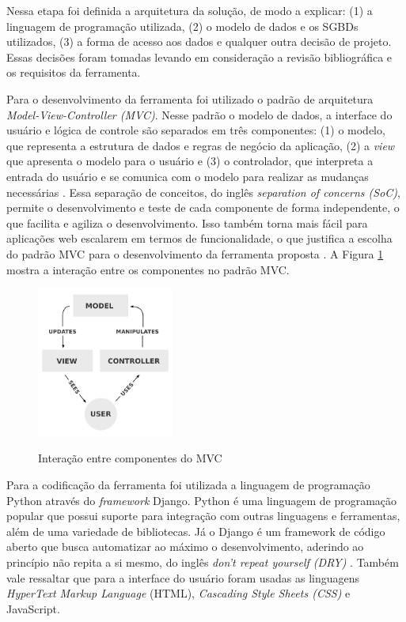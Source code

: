 Nessa etapa foi definida a arquitetura da solução, de modo a explicar: (1) a linguagem de 
programação utilizada, (2) o modelo de dados e os SGBDs utilizados, (3) a forma de acesso 
aos dados e qualquer outra decisão de projeto. Essas decisões foram tomadas levando em 
consideração a revisão bibliográfica e os requisitos da ferramenta.

Para o desenvolvimento da ferramenta foi utilizado o padrão de arquitetura 
\textit{Model-View-Controller (MVC)}. Nesse padrão o modelo de dados, a interface do 
usuário e lógica de controle são separados em três componentes: (1) o modelo, que 
representa a estrutura de dados e regras de negócio da aplicação, (2) a \textit{view} 
que apresenta o modelo para o usuário e (3) o controlador, que interpreta a entrada do 
usuário e se comunica com o modelo para realizar as mudanças necessárias \cite{plekhanova2009evaluating}. 
Essa separação de conceitos, do inglês \textit{separation of concerns (SoC)}, permite o 
desenvolvimento e teste de cada componente de forma independente, o que facilita e agiliza o 
desenvolvimento. Isso também torna mais fácil para aplicações web escalarem em termos de 
funcionalidade, o que justifica a escolha do padrão MVC para o desenvolvimento da ferramenta 
proposta \cite{gupta2012}. A Figura \ref{fig:mvc} mostra a interação entre os componentes no 
padrão MVC.

\begin{figure}[!htb]
    \centering
    \caption{Interação entre componentes do MVC}
    \includegraphics[width=0.4\textwidth]{./04-figuras/mvc}
    \label{fig:mvc}
\end{figure}

Para a codificação da ferramenta foi utilizada a linguagem de programação Python através do 
\textit{framework} Django. Python é uma linguagem de programação popular que possui suporte 
para integração com outras linguagens e ferramentas, além de uma variedade de bibliotecas. 
Já o Django é um framework de código aberto que busca automatizar ao máximo o desenvolvimento, 
aderindo ao princípio não repita a si mesmo, do inglês \textit{don’t repeat yourself (DRY)} 
\cite{plekhanova2009evaluating}. Também vale ressaltar que para a interface do usuário foram usadas as 
linguagens \textit{HyperText Markup Language} (HTML), \textit{Cascading Style Sheets (CSS)} 
e JavaScript.

